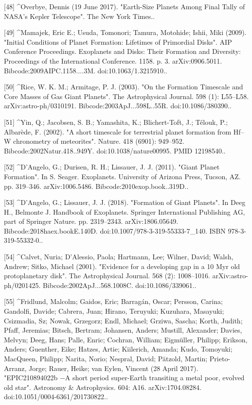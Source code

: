 [48]
^Overbye, Dennis (19 June 2017). "Earth-Size Planets Among Final Tally of NASA's Kepler Telescope". The New York Times..

[49]
^Mamajek, Eric E.; Usuda, Tomonori; Tamura, Motohide; Ishii, Miki (2009). "Initial Conditions of Planet Formation: Lifetimes of Primordial Disks". AIP Conference Proceedings. Exoplanets and Disks: Their Formation and Diversity: Proceedings of the International Conference. 1158. p. 3. arXiv:0906.5011. Bibcode:2009AIPC.1158....3M. doi:10.1063/1.3215910..

[50]
^Rice, W. K. M.; Armitage, P. J. (2003). "On the Formation Timescale and Core Masses of Gas Giant Planets". The Astrophysical Journal. 598 (1): L55–L58. arXiv:astro-ph/0310191. Bibcode:2003ApJ...598L..55R. doi:10.1086/380390..

[51]
^Yin, Q.; Jacobsen, S. B.; Yamashita, K.; Blichert-Toft, J.; Télouk, P.; Albarède, F. (2002). "A short timescale for terrestrial planet formation from Hf–W chronometry of meteorites". Nature. 418 (6901): 949–952. Bibcode:2002Natur.418..949Y. doi:10.1038/nature00995. PMID 12198540..

[52]
^D'Angelo, G.; Durisen, R. H.; Lissauer, J. J. (2011). "Giant Planet Formation". In S. Seager. Exoplanets. University of Arizona Press, Tucson, AZ. pp. 319–346. arXiv:1006.5486. Bibcode:2010exop.book..319D..

[53]
^D'Angelo, G.; Lissauer, J. J. (2018). "Formation of Giant Planets". In Deeg H., Belmonte J. Handbook of Exoplanets. Springer International Publishing AG, part of Springer Nature. pp. 2319–2343. arXiv:1806.05649. Bibcode:2018haex.bookE.140D. doi:10.1007/978-3-319-55333-7_140. ISBN 978-3-319-55332-0..

[54]
^Calvet, Nuria; D'Alessio, Paola; Hartmann, Lee; Wilner, David; Walsh, Andrew; Sitko, Michael (2001). "Evidence for a developing gap in a 10 Myr old protoplanetary disk". The Astrophysical Journal. 568 (2): 1008–1016. arXiv:astro-ph/0201425. Bibcode:2002ApJ...568.1008C. doi:10.1086/339061..

[55]
^Fridlund, Malcolm; Gaidos, Eric; Barragán, Oscar; Persson, Carina; Gandolfi, Davide; Cabrera, Juan; Hirano, Teruyuki; Kuzuhara, Masayuki; Csizmadia, Sz; Nowak, Grzegorz; Endl, Michael; Grziwa, Sascha; Korth, Judith; Pfaff, Jeremias; Bitsch, Bertram; Johansen, Anders; Mustill, Alexander; Davies, Melvyn; Deeg, Hans; Palle, Enric; Cochran, William; Eigmüller, Philipp; Erikson, Anders; Guenther, Eike; Hatzes, Artie; Kiilerich, Amanda; Kudo, Tomoyuki; MacQueen, Philipp; Narita, Norio; Nespral, David; Pätzold, Martin; Prieto-Arranz, Jorge; Rauer, Heike; van Eylen, Vincent (28 April 2017). "EPIC210894022b −A short period super-Earth transiting a metal poor, evolved old star". Astronomy & Astrophysics. 604: A16. arXiv:1704.08284. doi:10.1051/0004-6361/201730822..

